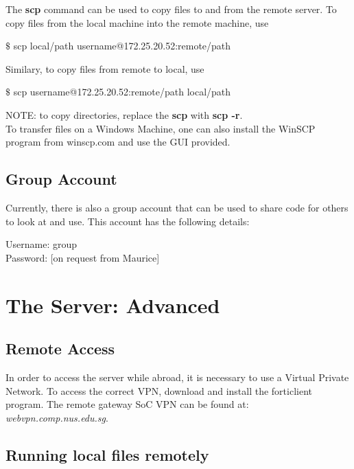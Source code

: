 The \textbf{scp} command can be used to copy files to and from the remote server. To copy files from the local machine into the remote machine, use 

\begin{framed}
$\$$ scp local/path username@172.25.20.52:remote/path
\end{framed}

Similary, to copy files from remote to local, use 

\begin{framed}
$\$$ scp username@172.25.20.52:remote/path local/path 
\end{framed}

NOTE: to copy directories, replace the \textbf{scp} with \textbf{scp -r}.\\

To transfer files on a Windows Machine, one can also install the WinSCP program from winscp.com and use the GUI provided.

\section{Group Account}
Currently, there is also a group account that can be used to share code for others to look at and use. This account has the following details:
\begin{mdframed}
Username: group\\
Password: [on request from Maurice]
\end{mdframed}

\chapter{The Server: Advanced}

\section{Remote Access}

In order to access the server while abroad, it is necessary to use a Virtual Private Network. To access the correct VPN, download and install the forticlient program. The remote gateway SoC VPN can be found at: \textit{webvpn.comp.nus.edu.sg}.\\

\section{Running local files remotely}

